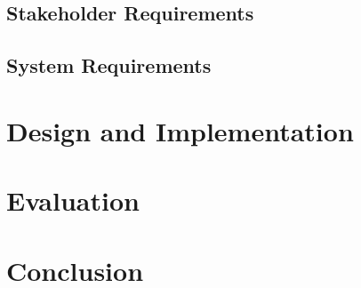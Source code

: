 \documentclass{UoYCSproject}
\begin{document}
\section{Stakeholder Requirements}

\section{System Requirements}

\chapter{Design and Implementation}

\chapter{Evaluation}

\chapter{Conclusion}

\printbibliography
\end{document}
